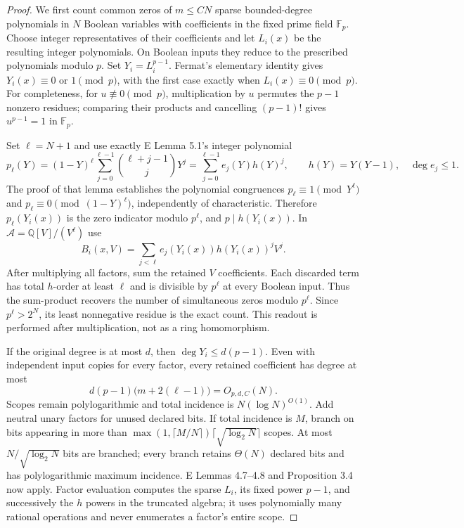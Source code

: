 \begin{proof}
We first count common zeros of $m\leq CN$ sparse bounded-degree polynomials in $N$ Boolean variables with coefficients in the fixed prime field $\mathbb F_p$. Choose integer representatives of their coefficients and let $L_i(x)$ be the resulting integer polynomials. On Boolean inputs they reduce to the prescribed polynomials modulo $p$. Set $Y_i=L_i^{p-1}$. Fermat's elementary identity gives $Y_i(x)\equiv0$ or $1\pmod p$, with the first case exactly when $L_i(x)\equiv0\pmod p$. For completeness, for $u\not\equiv0\pmod p$, multiplication by $u$ permutes the $p-1$ nonzero residues; comparing their products and cancelling $(p-1)!$ gives $u^{p-1}=1$ in $\mathbb F_p$.

Set $\ell=N+1$ and use exactly E Lemma 5.1's integer polynomial
\[
 p_\ell(Y)=(1-Y)^\ell\sum_{j=0}^{\ell-1}\binom{\ell+j-1}{j}Y^j
           =\sum_{j=0}^{\ell-1}e_j(Y)h(Y)^j,
 \qquad h(Y)=Y(Y-1),\quad\deg e_j\leq1.
\]
The proof of that lemma establishes the polynomial congruences $p_\ell\equiv1\pmod{Y^\ell}$ and $p_\ell\equiv0\pmod{(1-Y)^\ell}$, independently of characteristic. Therefore $p_\ell(Y_i(x))$ is the zero indicator modulo $p^\ell$, and $p\mid h(Y_i(x))$. In $\mathcal A=\mathbb Q[V]/(V^\ell)$ use
\[
 B_i(x,V)=\sum_{j<\ell}e_j(Y_i(x))h(Y_i(x))^jV^j.
\]
After multiplying all factors, sum the retained $V$ coefficients. Each discarded term has total $h$-order at least $\ell$ and is divisible by $p^\ell$ at every Boolean input. Thus the sum-product recovers the number of simultaneous zeros modulo $p^\ell$. Since $p^\ell>2^N$, its least nonnegative residue is the exact count. This readout is performed after multiplication, not as a ring homomorphism.

If the original degree is at most $d$, then $\deg Y_i\leq d(p-1)$. Even with independent input copies for every factor, every retained coefficient has degree at most
\[
 d(p-1)\bigl(m+2(\ell-1)\bigr)=O_{p,d,C}(N).
\]
Scopes remain polylogarithmic and total incidence is $N(\log N)^{O(1)}$. Add neutral unary factors for unused declared bits. If total incidence is $M$, branch on bits appearing in more than
$\max(1,\lceil M/N\rceil)\lceil\sqrt{\log_2N}\rceil$ scopes. At most $N/\sqrt{\log_2N}$ bits are branched; every branch retains $\Theta(N)$ declared bits and has polylogarithmic maximum incidence. E Lemmas 4.7--4.8 and Proposition 3.4 now apply. Factor evaluation computes the sparse $L_i$, its fixed power $p-1$, and successively the $h$ powers in the truncated algebra; it uses polynomially many rational operations and never enumerates a factor's entire scope.


\end{proof}
